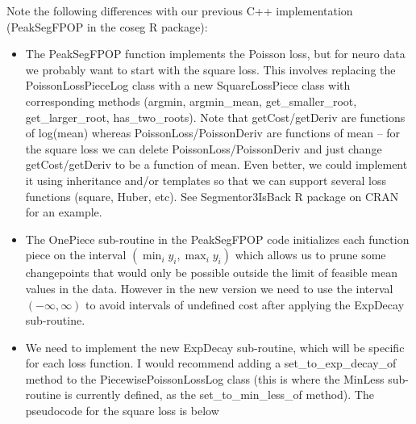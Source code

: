 \documentclass{article}
\begin{document}
Note the
following differences with our previous C++ implementation
(PeakSegFPOP in the coseg R package):
\begin{itemize}
\item The PeakSegFPOP function implements the Poisson loss, but for
  neuro data we probably want to start with the square loss. This
  involves replacing the PoissonLossPieceLog class with a new
  SquareLossPiece class with corresponding methods (argmin,
  argmin\_mean, get\_smaller\_root, get\_larger\_root,
  has\_two\_roots). Note that getCost/getDeriv are functions of
  log(mean) whereas PoissonLoss/PoissonDeriv are functions of mean --
  for the square loss we can delete PoissonLoss/PoissonDeriv and just
  change getCost/getDeriv to be a function of mean. Even better, we
  could implement it using inheritance and/or templates so that we can
  support several loss functions (square, Huber, etc). See
  Segmentor3IsBack R package on CRAN for an example.
\item The OnePiece sub-routine in the PeakSegFPOP code initializes
  each function piece on the interval $(\min_i y_i,\max_i y_i)$ which
  allows us to prune some changepoints that would only be possible
  outside the limit of feasible mean values in the data. However in
  the new version we need to use the interval $(-\infty,\infty)$ to
  avoid intervals of undefined cost after applying the ExpDecay
  sub-routine.
\item We need to implement the new ExpDecay sub-routine, which will be
  specific for each loss function. I would recommend adding a
  set\_to\_exp\_decay\_of method to the PiecewisePoissonLossLog class
  (this is where the MinLess sub-routine is currently defined, as the
  set\_to\_min\_less\_of method). The pseudocode for the square loss
  is below
\end{itemize}
\end{document}
